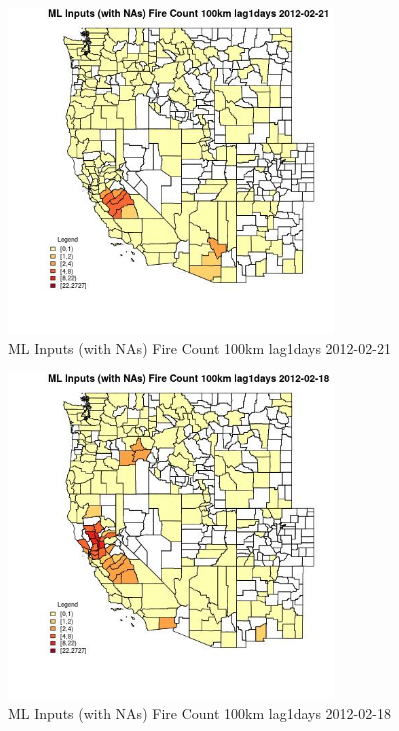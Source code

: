 \begin{figure} 
\centering  
\includegraphics[width=0.77\textwidth]{Code_Outputs/Report_ML_input_PM25_Step4_part_f_de_duplicated_aveswNAs_CountyFire_Count_100km_lag1daysMean2012-02-21.jpg} 
\caption{\label{fig:Report_ML_input_PM25_Step4_part_f_de_duplicated_aveswNAsCountyFire_Count_100km_lag1daysMean2012-02-21}ML Inputs (with NAs) Fire Count 100km lag1days 2012-02-21} 
\end{figure} 
 

\begin{figure} 
\centering  
\includegraphics[width=0.77\textwidth]{Code_Outputs/Report_ML_input_PM25_Step4_part_f_de_duplicated_aveswNAs_CountyFire_Count_100km_lag1daysMean2012-02-18.jpg} 
\caption{\label{fig:Report_ML_input_PM25_Step4_part_f_de_duplicated_aveswNAsCountyFire_Count_100km_lag1daysMean2012-02-18}ML Inputs (with NAs) Fire Count 100km lag1days 2012-02-18} 
\end{figure} 
 

